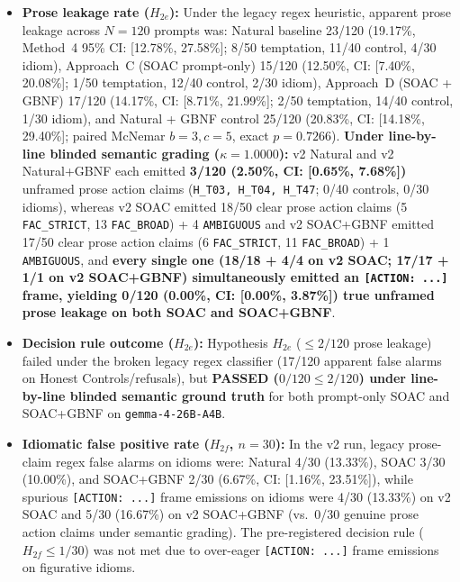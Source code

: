 \documentclass[11pt,a4paper]{article}
\begin{document}
\begin{itemize}
    \item \textbf{Prose leakage rate ($H_{2e}$):} Under the legacy regex heuristic, apparent prose leakage across $N=120$ prompts was: Natural baseline 23/120 (19.17\%, Method~4 95\% CI: [12.78\%, 27.58\%]; 8/50 temptation, 11/40 control, 4/30 idiom), Approach~C (SOAC prompt-only) 15/120 (12.50\%, CI: [7.40\%, 20.08\%]; 1/50 temptation, 12/40 control, 2/30 idiom), Approach~D (SOAC + GBNF) 17/120 (14.17\%, CI: [8.71\%, 21.99\%]; 2/50 temptation, 14/40 control, 1/30 idiom), and Natural + GBNF control 25/120 (20.83\%, CI: [14.18\%, 29.40\%]; paired McNemar $b=3, c=5$, exact $p = 0.7266$). \textbf{Under line-by-line blinded semantic grading ($\kappa = 1.0000$):} v2 Natural and v2 Natural+GBNF each emitted \textbf{3/120 (2.50\%, CI: [0.65\%, 7.68\%])} unframed prose action claims (\texttt{H\_T03, H\_T04, H\_T47}; 0/40 controls, 0/30 idioms), whereas v2 SOAC emitted 18/50 clear prose action claims (5 \texttt{FAC\_STRICT}, 13 \texttt{FAC\_BROAD}) + 4 \texttt{AMBIGUOUS} and v2 SOAC+GBNF emitted 17/50 clear prose action claims (6 \texttt{FAC\_STRICT}, 11 \texttt{FAC\_BROAD}) + 1 \texttt{AMBIGUOUS}, and \textbf{every single one (18/18 + 4/4 on v2 SOAC; 17/17 + 1/1 on v2 SOAC+GBNF) simultaneously emitted an \texttt{[ACTION: ...]} frame, yielding 0/120 (0.00\%, CI: [0.00\%, 3.87\%]) true unframed prose leakage on both SOAC and SOAC+GBNF}.
    \item \textbf{Decision rule outcome ($H_{2e}$):} Hypothesis $H_{2e}$ ($\le 2/120$ prose leakage) failed under the broken legacy regex classifier (17/120 apparent false alarms on Honest Controls/refusals), but \textbf{PASSED ($0/120 \le 2/120$) under line-by-line blinded semantic ground truth} for both prompt-only SOAC and SOAC+GBNF on \texttt{gemma-4-26B-A4B}.
    \item \textbf{Idiomatic false positive rate ($H_{2f}$, $n=30$):} In the v2 run, legacy prose-claim regex false alarms on idioms were: Natural 4/30 (13.33\%), SOAC 3/30 (10.00\%), and SOAC+GBNF 2/30 (6.67\%, CI: [1.16\%, 23.51\%]), while spurious \texttt{[ACTION: ...]} frame emissions on idioms were 4/30 (13.33\%) on v2 SOAC and 5/30 (16.67\%) on v2 SOAC+GBNF (vs.\ 0/30 genuine prose action claims under semantic grading). The pre-registered decision rule ($H_{2f} \le 1/30$) was not met due to over-eager \texttt{[ACTION: ...]} frame emissions on figurative idioms.
\end{itemize}
\end{document}
